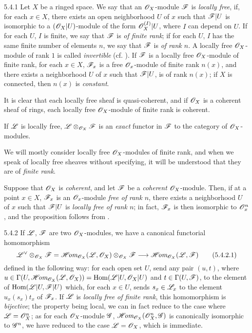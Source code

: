 \begin{env}{5.4.1}
\label{env-0.5.4.1}
Let $X$ be a ringed space. We say that an $\mathscr{O}_X$-module $\mathscr{F}$ is
\emph{locally free}, if, for each $x\in X$, there exists an open neighborhood
$U$ of $x$ such that $\mathscr{F}|U$ is isomorphic to a $(\mathscr{O}_X|U)$-module of the
form $\mathscr{O}_X^{(I)}|U$, where $I$ can depend on $U$. If for each $U$, $I$ is
finite, we say that $\mathscr{F}$ is \emph{of finite rank}; if for each $U$, $I$ has
the same finite number of elements $n$, we say that $\mathscr{F}$ is \emph{of rank
$n$}. A locally free $\mathscr{O}_X$-module of rank $1$ is called \emph{invertible}
(cf. ). If $\mathscr{F}$ is a locally free $\mathscr{O}_X$-module of finite
rank, for each $x\in X$, $\mathscr{F}_x$ is a free $\mathscr{O}_x$-module of finite rank
$n(x)$, and there exists a neighborhood $U$ of $x$ such that $\mathscr{F}|U$, is of
rank $n(x)$; if $X$ is connected, then $n(x)$ is \emph{constant}.

It is clear that each locally free sheaf is quasi-coherent, and if $\mathscr{O}_X$ is a
coherent sheaf of rings, each locally free $\mathscr{O}_X$-module of finite rank is
coherent.

If $\mathscr{L}$ is locally free, $\mathscr{L}\otimes_{\mathscr{O}_X}\mathscr{F}$ is an \emph{exact}
functor in $\mathscr{F}$ to the category of $\mathscr{O}_X$-modules.

We will mostly consider locally free $\mathscr{O}_X$-modules of finite rank,
and when we speak of locally free sheaves without specifying, it will be
understood that they are of \emph{finite rank}.

Suppose that $\mathscr{O}_X$ is \emph{coherent}, and let $\mathscr{F}$ be a \emph{coherent}
$\mathscr{O}_X$-module. Then, if at a point $x\in X$, $\mathscr{F}_x$ is an $\mathscr{O}_x$-module
\emph{free of rank $n$}, there exists a neighborhood $U$ of $x$ such that
$\mathscr{F}|U$ is \emph{locally free of rank $n$}; in fact, $\mathscr{F}_x$ is then
isomorphic to $\mathscr{O}_x^n$, and the proposition follows from .
\end{env}

\begin{env}{5.4.2}
\label{env-0.5.4.2}
If $\mathscr{L}$, $\mathscr{F}$ are two $\mathscr{O}_X$-modules, we have a canonical functorial
homomorphism
\[
  {\mathscr{L}}^\vee\otimes_{\mathscr{O}_X}\mathscr{F}
  =\mathscr{H}\!\textit{om}_{\mathscr{O}_X}(\mathscr{L},\mathscr{O}_X)\otimes_{\mathscr{O}_X}\mathscr{F}
  \longrightarrow\mathscr{H}\!\textit{om}_{\mathscr{O}_X}(\mathscr{L},\mathscr{F})
  \tag{5.4.2.1}
\]
defined in the following way: for each open set $U$, send any pair $(u,t)$,
where $u\in\Gamma(U,\mathscr{H}\!\textit{om}_{\mathscr{O}_X}(\mathscr{L},\mathscr{O}_X))={\mathop{\mathrm{Hom}}\nolimits}(\mathscr{L}|U,\mathscr{O}_X|U)$ and
$t\in\Gamma(U,\mathscr{F})$, to the element of ${\mathop{\mathrm{Hom}}\nolimits}(\mathscr{L}|U,\mathscr{F}|U)$ which, for
each $x\in U$, sends $s_x\in\mathscr{L}_x$ to the element $u_x(s_x)t_x$ of
$\mathscr{F}_x$. If $\mathscr{L}$ is \emph{locally free of finite rank}, this homomorphism
is \emph{bijective}; the property being local, we can in fact reduce to the case
where $\mathscr{L}=\mathscr{O}_X^n$; as for each $\mathscr{O}_X$-module $\mathscr{G}$,
$\mathscr{H}\!\textit{om}_{\mathscr{O}_X}(\mathscr{O}_X^n,\mathscr{G})$ is canonically isomorphic to $\mathscr{G}^n$, we
have reduced to the case $\mathscr{L}=\mathscr{O}_X$, which is immediate.
\end{env}

